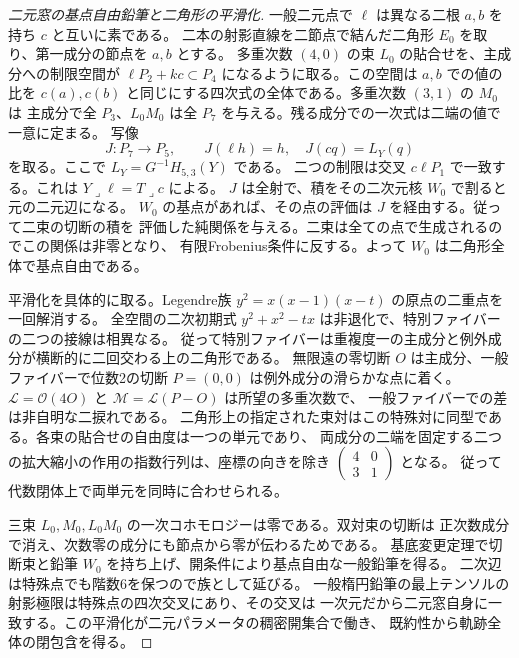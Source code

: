 \begin{proof}[二元窓の基点自由鉛筆と二角形の平滑化]
一般二元点で $\ell$ は異なる二根 $a,b$ を持ち $c$ と互いに素である。
二本の射影直線を二節点で結んだ二角形 $E_0$ を取り、第一成分の節点を $a,b$ とする。
多重次数 $(4,0)$ の束 $L_0$ の貼合せを、主成分への制限空間が
$\ell P_2+kc\subset P_4$ になるように取る。この空間は $a,b$ での値の比を
$c(a),c(b)$ と同じにする四次式の全体である。多重次数 $(3,1)$ の $M_0$ は
主成分で全 $P_3$、$L_0M_0$ は全 $P_7$ を与える。残る成分での一次式は二端の値で一意に定まる。
写像
\[
 J:P_7\longrightarrow P_5,\qquad J(\ell h)=h,\quad J(cq)=L_Y(q)
\]
を取る。ここで $L_Y=G^{-1}H_{5,3}(Y)$ である。
二つの制限は交叉 $c\ell P_1$ で一致する。これは $Y\mathbin{\lrcorner}\ell=T\mathbin{\lrcorner}c$ による。
$J$ は全射で、積をその二次元核 $W_0$ で割ると元の二元辺になる。
$W_0$ の基点があれば、その点の評価は $J$ を経由する。従って二束の切断の積を
評価した純関係を与える。二束は全ての点で生成されるのでこの関係は非零となり、
有限Frobenius条件に反する。よって $W_0$ は二角形全体で基点自由である。

平滑化を具体的に取る。Legendre族 $y^2=x(x-1)(x-t)$ の原点の二重点を一回解消する。
全空間の二次初期式 $y^2+x^2-tx$ は非退化で、特別ファイバーの二つの接線は相異なる。
従って特別ファイバーは重複度一の主成分と例外成分が横断的に二回交わる上の二角形である。
無限遠の零切断 $O$ は主成分、一般ファイバーで位数2の切断 $P=(0,0)$ は例外成分の滑らかな点に着く。
$\mathcal L=\mathcal O(4O)$ と $\mathcal M=\mathcal L(P-O)$ は所望の多重次数で、
一般ファイバーでの差は非自明な二捩れである。
二角形上の指定された束対はこの特殊対に同型である。各束の貼合せの自由度は一つの単元であり、
両成分の二端を固定する二つの拡大縮小の作用の指数行列は、座標の向きを除き
$\left(\begin{smallmatrix}4&0\\3&1\end{smallmatrix}\right)$ となる。
従って代数閉体上で両単元を同時に合わせられる。

三束 $L_0,M_0,L_0M_0$ の一次コホモロジーは零である。双対束の切断は
正次数成分で消え、次数零の成分にも節点から零が伝わるためである。
基底変更定理で切断束と鉛筆 $W_0$ を持ち上げ、開条件により基点自由な一般鉛筆を得る。
二次辺は特殊点でも階数6を保つので族として延びる。
一般楕円鉛筆の最上テンソルの射影極限は特殊点の四次交叉にあり、その交叉は
一次元だから二元窓自身に一致する。この平滑化が二元パラメータの稠密開集合で働き、
既約性から軌跡全体の閉包含を得る。
\end{proof}
